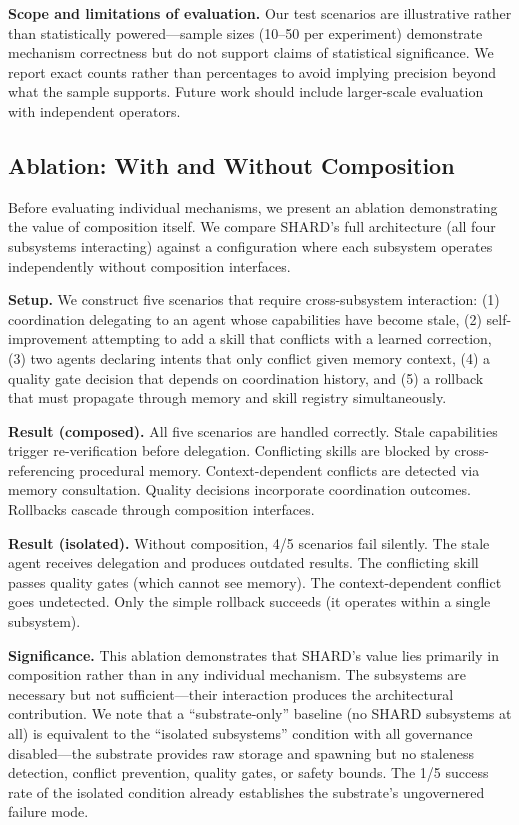 \documentclass[11pt]{article}
\begin{document}
\textbf{Scope and limitations of evaluation.} Our test scenarios are illustrative rather than statistically powered---sample sizes (10--50 per experiment) demonstrate mechanism correctness but do not support claims of statistical significance. We report exact counts rather than percentages to avoid implying precision beyond what the sample supports. Future work should include larger-scale evaluation with independent operators.

\subsection{Ablation: With and Without Composition}

Before evaluating individual mechanisms, we present an ablation demonstrating the value of composition itself. We compare SHARD's full architecture (all four subsystems interacting) against a configuration where each subsystem operates independently without composition interfaces.

\textbf{Setup.} We construct five scenarios that require cross-subsystem interaction: (1) coordination delegating to an agent whose capabilities have become stale, (2) self-improvement attempting to add a skill that conflicts with a learned correction, (3) two agents declaring intents that only conflict given memory context, (4) a quality gate decision that depends on coordination history, and (5) a rollback that must propagate through memory and skill registry simultaneously.

\textbf{Result (composed).} All five scenarios are handled correctly. Stale capabilities trigger re-verification before delegation. Conflicting skills are blocked by cross-referencing procedural memory. Context-dependent conflicts are detected via memory consultation. Quality decisions incorporate coordination outcomes. Rollbacks cascade through composition interfaces.

\textbf{Result (isolated).} Without composition, 4/5 scenarios fail silently. The stale agent receives delegation and produces outdated results. The conflicting skill passes quality gates (which cannot see memory). The context-dependent conflict goes undetected. Only the simple rollback succeeds (it operates within a single subsystem).

\textbf{Significance.} This ablation demonstrates that SHARD's value lies primarily in composition rather than in any individual mechanism. The subsystems are necessary but not sufficient---their interaction produces the architectural contribution. We note that a ``substrate-only'' baseline (no SHARD subsystems at all) is equivalent to the ``isolated subsystems'' condition with all governance disabled---the substrate provides raw storage and spawning but no staleness detection, conflict prevention, quality gates, or safety bounds. The 1/5 success rate of the isolated condition already establishes the substrate's ungovernered failure mode.
\end{document}

